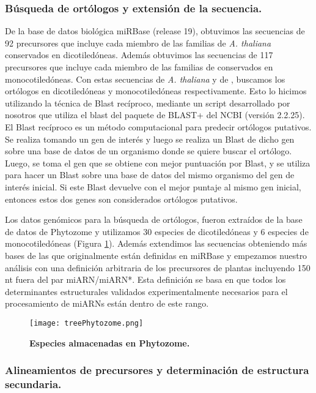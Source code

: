 \subsubsection{Búsqueda de ortólogos y extensión de la secuencia.}\label{sec:reciprocal_blast}
De la base de datos biológica miRBase (release 19), obtuvimos las secuencias de 92 precursores que incluye cada miembro de las familias de \textit{A. thaliana} conservados en dicotiledóneas.
Además obtuvimos las secuencias de 117 precursores que incluye cada miembro de las familias de  conservados en monocotiledóneas.
Con estas secuencias de \textit{A. thaliana} y de , buscamos los ortólogos en dicotiledóneas y monocotiledóneas respectivamente.
Esto lo hicimos utilizando la técnica de Blast recíproco, mediante un script desarrollado por nosotros que utiliza el blast del paquete de BLAST+ del NCBI (versión 2.2.25).
El Blast recíproco es un método computacional para predecir ortólogos putativos. 
Se realiza tomando un gen de interés y luego se realiza un Blast de dicho gen sobre una base de datos de un organismo donde se quiere buscar el ortólogo.
Luego, se toma el gen que se obtiene con mejor puntuación por Blast, y se utiliza para hacer un Blast sobre una base de datos del mismo organismo del gen de interés inicial.
Si este Blast devuelve con el mejor puntaje al mismo gen inicial, entonces estos dos genes son considerados ortólogos putativos. 

Los datos genómicos para la búsqueda de ortólogos, fueron extraídos de la base de datos de Phytozome y utilizamos 30 especies de dicotiledóneas y 6 especies de monocotiledóneas (Figura \ref{fig:treePhytozome}).
Además extendimos las secuencias obteniendo más bases de las que originalmente están definidas en miRBase y empezamos nuestro análisis con una definición arbitraria de los precursores de plantas incluyendo 150 nt fuera del par miARN/miARN*.
Esta definición se basa en que todos los determinantes estructurales validados experimentalmente necesarios para el procesamiento de miARNs están dentro de este rango.

\begin{figure}[htbp!] 
    \centering    
    \texttt{[image: treePhytozome.png]}
    \caption[Especies almacenadas en Phytozome]{
    \textbf{Especies almacenadas en Phytozome.}
    }
    \label{fig:treePhytozome}
\end{figure}

\subsubsection{Alineamientos de precursores y determinación de estructura secundaria.}

